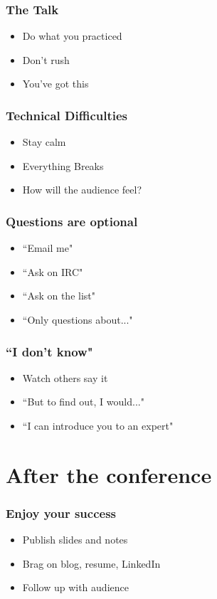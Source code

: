 \documentclass{beamer}
\begin{document}
\begin{frame}[fragile]
\frametitle{The Talk}
\begin{itemize}[<+(1)->]
\item Do what you practiced
\item Don't rush
\item You've got this
\end{itemize}
\end{frame}

\begin{frame}[fragile]
\frametitle{Technical Difficulties}
\begin{itemize}[<+(1)->]
\item Stay calm
\item Everything Breaks
\item How will the audience feel?
\end{itemize}
\end{frame}

\begin{frame}[fragile]
\frametitle{Questions are optional}
\begin{itemize}[<+(1)->]
\item ``Email me"
\item ``Ask on IRC"
\item ``Ask on the list"
\item ``Only questions about..."
\end{itemize}
\end{frame}

\begin{frame}[fragile]
\frametitle{``I don't know"}
\begin{itemize}[<+(1)->]
\item Watch others say it
\item ``But to find out, I would..."
\item ``I can introduce you to an expert"
\end{itemize}
\end{frame}

\section{After the conference}

\begin{frame}[fragile]
\tableofcontents[currentsection]
\end{frame}

\begin{frame}[fragile]
\frametitle{Enjoy your success}
\begin{itemize}[<+(1)->]
\item Publish slides and notes
\item Brag on blog, resume, LinkedIn
\item Follow up with audience
\end{itemize}
\end{frame}
\end{document}

